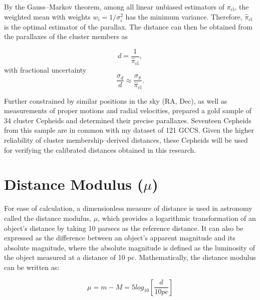 By the Gauss--Markov theorem, among all linear unbiased estimators of $\pi_{\mathrm{cl}}$, the weighted mean with weights $w_i = 1/\sigma_i^2$ has the minimum variance. Therefore, $\hat{\pi}_{\mathrm{cl}}$ is the optimal estimator of the parallax. The distance can then be obtained from the parallaxes of the cluster members as

\begin{equation}
d = \frac{1}{\hat{\pi}_{\mathrm{cl}}},
\end{equation}
with fractional uncertainty
\begin{equation}
\frac{\sigma_d}{d}
\approx
\frac{\sigma_{\hat{\pi}}}{\hat{\pi}_{\mathrm{cl}}}.
\end{equation}

Further constrained by similar positions in the sky (RA, Dec), as well as measurements of proper motions and radial velocities, \cite{2023cruz} prepared a gold sample of 34 cluster Cepheids and determined their precise parallaxes. Seventeen Cepheids from this sample are in common with my dataset of 121 GCCS. Given the higher reliability of cluster membership–derived distances, these Cepheids will be used for verifying the calibrated distances obtained in this research.

\section{Distance Modulus ($\mu$)}




For ease of calculation, a dimensionless measure of distance is used in astronomy called the distance modulus, $\mu$, which provides a logarithmic transformation of an object's distance by taking 10 parsecs as the reference distance. It can also be expressed as the difference between an object's apparent magnitude and its absolute magnitude, where the absolute magnitude is defined as the luminosity of the object measured at a distance of 10 pc. Mathematically, the distance modulus can be written as:

$$\mu = m - M = 5 log_{10}\left[\frac{d}{10 pc}\right] $$ 
 


